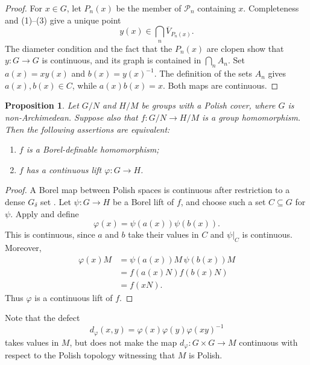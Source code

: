 \documentclass[12pt]{amsart}
\newtheorem{proposition}[theorem]{Proposition}
\theoremstyle{definition}
\begin{document}
\begin{proof}
For $x\in G$, let $P_{n}(x)$ be the member of $\mathcal{P}_{n}$ containing $%
x $. Completeness and (1)--(3) give a unique point 
\begin{equation*}
y(x)\in \bigcap_{n}\overline{V}_{P_{n}(x)}.
\end{equation*}%
The diameter condition and the fact that the $P_{n}(x)$ are clopen show that 
$y:G\rightarrow G$ is continuous, and its graph is contained in $%
\bigcap_{n}A_{n}$. Set $a(x)=xy(x)$ and $b(x)=y(x)^{-1}$. The definition of
the sets $A_{n}$ gives $a(x),b(x)\in C$, while $a(x)b(x)=x$. Both maps are
continuous.
\end{proof}

\begin{proposition}
\label{prop:continuous-lift} Let $G/N$ and $H/M$ be groups with a Polish
cover, where $G$ is non-Archimedean. Suppose also that $f:G/N\longrightarrow
H/M$ is a group homomorphism. Then the following assertions are equivalent:

\begin{enumerate}
\item $f$ is a Borel-definable homomorphism;

\item $f$ has a continuous lift $\varphi :G\rightarrow H$.
\end{enumerate}
\end{proposition}

\begin{proof}
A Borel map between Polish spaces is continuous after restriction to a dense 
$G_{\delta }$ set \cite[Theorem~8.38]{kechris_classical_1995}. Let $%
\psi:G\rightarrow H$ be a Borel lift of $f$, and choose such a set $%
C\subseteq G$ for $\psi$. Apply  and define 
\begin{equation*}
\varphi (x)=\psi (a(x))\psi (b(x)).
\end{equation*}%
This is continuous, since $a$ and $b$ take their values in $C$ and $\psi
|_{C}$ is continuous. Moreover, 
\begin{align*}
\varphi (x)M& =\psi (a(x))M\,\psi (b(x))M \\
& =f(a(x)N)f(b(x)N) \\
& =f(xN).
\end{align*}%
Thus $\varphi$ is a continuous lift of $f$.
\end{proof}

Note that the defect 
\begin{equation*}
d_{\varphi }(x,y)=\varphi (x)\varphi (y)\varphi (xy)^{-1}
\end{equation*}%
takes values in $M$, but  does not make the map $%
d_{\varphi }:G\times G\rightarrow M$ continuous with respect to the Polish
topology witnessing that $M$ is Polish.
\end{document}
